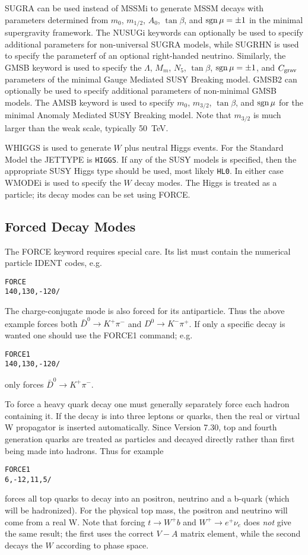       SUGRA can be used instead of MSSMi to generate MSSM decays with
parameters determined from $m_0$, $m_{1/2}$, $A_0$, $\tan\beta$, and
$\mathop{\rm sgn}\mu=\pm1$ in the minimal supergravity framework. The NUSUGi
keywords can optionally be used to specify additional parameters for
non-universal SUGRA models, while SUGRHN is used to specify the
parameterf of an optional right-handed neutrino. Similarly, the GMSB
keyword is used to specify the $\Lambda$, $M_m$, $N_5$, $\tan\beta$,
$\mathop{\rm sgn}\mu=\pm1$, and $C_{\rm grav}$ parameters of the minimal Gauge
Mediated SUSY Breaking model. GMSB2 can optionally be used to specify
additional parameters of non-minimal GMSB models. The AMSB keyword is
used to specify $m_0$, $m_{3/2}$, $\tan\beta$, and $\mathop{\rm sgn}\mu$ for the
minimal Anomaly Mediated SUSY Breaking model. Note that $m_{3/2}$ is
much larger than the weak scale, typically 50~TeV.

      WHIGGS is used to generate $W$ plus neutral Higgs events. For the
Standard Model the JETTYPE is \verb|HIGGS|. If any of the SUSY models
is specified, then the appropriate SUSY Higgs type should be used,
most likely \verb|HL0|. In either case WMODEi is used to specify the
$W$ decay modes. The Higgs is treated as a particle; its decay modes
can be set using FORCE.

\subsection{Forced Decay Modes}

      The FORCE keyword requires special care. Its list must contain the
numerical particle IDENT codes, e.g.
\begin{verbatim}
FORCE
140,130,-120/
\end{verbatim}
The charge-conjugate mode is also forced for its antiparticle. Thus the
above example forces both $\bar D^0 \to K^+ \pi^-$ and $D^0 \to K^-
\pi^+$. If only a specific decay is wanted one should use the FORCE1
command; e.g.
\begin{verbatim}
FORCE1
140,130,-120/
\end{verbatim}
only forces $\bar D^0 \to K^+ \pi^-$.

      To force a heavy quark decay one must generally separately force
each hadron containing it. If the decay is into three leptons or quarks,
then the real or virtual W propagator is inserted automatically. Since
Version 7.30, top and fourth generation quarks are treated as
particles and decayed directly rather than first being made into
hadrons. Thus for example
\begin{verbatim}
FORCE1
6,-12,11,5/
\end{verbatim}
forces all top quarks to decay into an positron, neutrino and a
b-quark (which will be hadronized). For the physical top mass, the
positron and neutrino will come from a real W. Note that forcing $t
\to W^+ b$ and $W^+ \to e^+ \nu_e$ does {\it not} give the same
result; the first uses the correct $V-A$ matrix element, while the
second decays the $W$ according to phase space.

